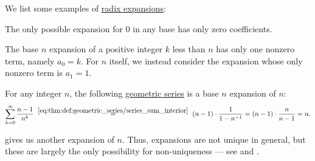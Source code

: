 \begin{example}\label{ex:def:real_number_radix_expansion}
  We list some examples of \hyperref[def:real_number_radix_expansion]{radix expansions}:
  \begin{thmenum}
     The only possible expansion for \( 0 \) in any base has only zero coefficients.

     The base \( n \) expansion of a positive integer \( k \) less than \( n \) has only one nonzero term, namely \( a_0 = k \). For \( n \) itself, we instead consider the expansion whose only nonzero term is \( a_1 = 1 \).

     For any integer \( n \), the following \hyperref[eq:def:geometric_series]{geometric series} is a base \( n \) expansion of \( n \):
    \begin{equation}\label{eq:ex:def:real_number_radix_expansion/geometric}
      \sum_{k=0}^\infty \frac {n - 1} {n^k}
      \reloset{\eqref{eq:thm:def:geometric_series/series_sum_interior}} =
      (n - 1) \cdot \frac 1 {1 - n^{-1}}
      =
      (n - 1) \cdot \frac n {n - 1}
      =
      n.
    \end{equation}

     gives us another expansion of \( n \). Thus, expansions are not unique in general, but these are largely the only possibility for non-uniqueness --- see  and .
  \end{thmenum}
\end{example}

